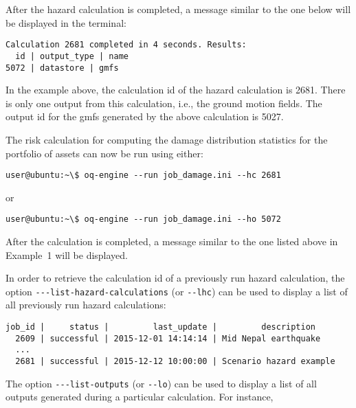 After the hazard calculation is completed, a message similar to the one below
will be displayed in the terminal:

\begin{Verbatim}[frame=single, commandchars=\\\{\}, samepage=true]
Calculation 2681 completed in 4 seconds. Results:
  id | output_type | name
5072 | datastore | gmfs
\end{Verbatim}

In the example above, the calculation id of the hazard calculation is 2681.
There is only one output from this calculation, i.e., the ground motion
fields. The output id for the gmfs generated by the above calculation is 5027.

The risk calculation for computing the damage distribution statistics for the
portfolio of assets can now be run using either:

\begin{Verbatim}[frame=single, commandchars=\\\{\}, samepage=true]
user@ubuntu:~\$ oq-engine --run job_damage.ini --hc 2681
\end{Verbatim}

or

\begin{Verbatim}[frame=single, commandchars=\\\{\}, samepage=true]
user@ubuntu:~\$ oq-engine --run job_damage.ini --ho 5072
\end{Verbatim}

After the calculation is completed, a message similar to the one listed above
in Example~1 will be displayed.

In order to retrieve the calculation id of a previously run hazard calculation,
the option \Verb+---list-hazard-calculations+ (or \Verb+--lhc+) can be used to
display a list of all previously run hazard calculations:

\begin{Verbatim}[frame=single, commandchars=\\\{\}, samepage=true]
job_id |     status |         last_update |         description
  2609 | successful | 2015-12-01 14:14:14 | Mid Nepal earthquake
  ...
  2681 | successful | 2015-12-12 10:00:00 | Scenario hazard example
\end{Verbatim}

The option \Verb+---list-outputs+ (or \Verb+--lo+) can be used to display a
list of all outputs generated during a particular calculation. For instance,

